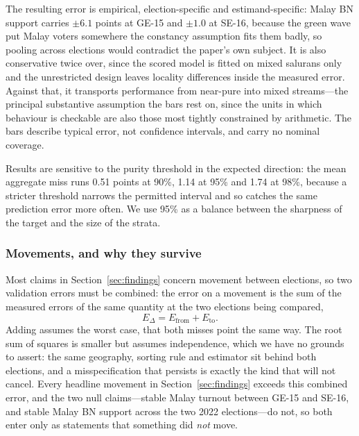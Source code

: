 \documentclass[11pt]{article}
\begin{document}


The resulting error is empirical, election-specific and estimand-specific: Malay BN support carries $\pm6.1$ points at GE-15 and $\pm1.0$ at SE-16, because the green wave put Malay voters somewhere the constancy assumption fits them badly, so pooling across elections would contradict the paper's own subject. It is also conservative twice over, since the scored model is fitted on mixed salurans only and the unrestricted design leaves locality differences inside the measured error. Against that, it transports performance from near-pure into mixed streams---the principal substantive assumption the bars rest on, since the units in which behaviour is checkable are also those most tightly constrained by arithmetic. The bars describe typical error, not confidence intervals, and carry no nominal coverage.

Results are sensitive to the purity threshold in the expected direction: the mean aggregate miss runs 0.51 points at 90\%, 1.14 at 95\% and 1.74 at 98\%, because a stricter threshold narrows the permitted interval and so catches the same prediction error more often. We use 95\% as a balance between the sharpness of the target and the size of the strata.

\subsubsection*{Movements, and why they survive}

Most claims in Section~\ref{sec:findings} concern movement between elections, so two validation errors must be combined: the error on a movement is the sum of the measured errors of the same quantity at the two elections being compared,
\begin{equation}
	E_{\Delta} = E_{\text{from}} + E_{\text{to}}.
	\label{eq:combine}
\end{equation}
Adding assumes the worst case, that both misses point the same way. The root sum of squares is smaller but assumes independence, which we have no grounds to assert: the same geography, sorting rule and estimator sit behind both elections, and a misspecification that persists is exactly the kind that will not cancel. Every headline movement in Section~\ref{sec:findings} exceeds this combined error, and the two null claims---stable Malay turnout between GE-15 and SE-16, and stable Malay BN support across the two 2022 elections---do not, so both enter only as statements that something did \emph{not} move.
\end{document}
